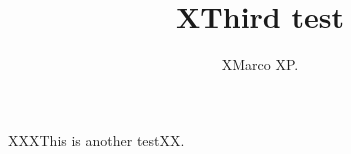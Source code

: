 \documentclass[DIV=9,fontsize=10pt,oneside,paper=a5]{scrartcl}
\title{XThird test}
\date{}
\author{XMarco XP.}
\begin{document}
\maketitle




XXXThis is another testXX.



\cleardoublepage

\thispagestyle{empty}
\strut
\vfill

\begin{center}





\end{center}
\end{document}
